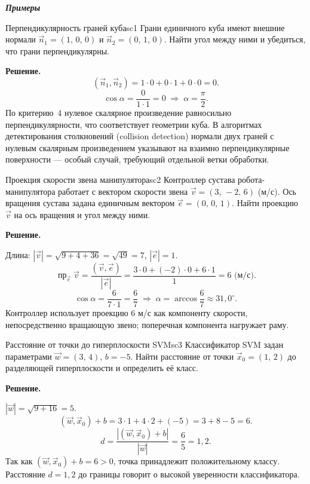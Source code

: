 \documentclass[12pt,a4paper]{article}
\begin{document}
\medskip

\textbf{\textit{Примеры}}

\begin{exampleBox}{Перпендикулярность граней куба}{sc1}
  Грани единичного куба имеют внешние нормали
  $\vec{n}_1 = (1,\,0,\,0)$ и $\vec{n}_2 = (0,\,1,\,0)$.
  Найти угол между ними и убедиться, что грани перпендикулярны.

  \textbf{Решение.}
  \[
    (\vec{n}_1,\vec{n}_2) = 1{\cdot}0 + 0{\cdot}1 + 0{\cdot}0 = 0.
  \]
  \[
    \cos\alpha = \frac{0}{1\cdot 1} = 0
    \;\Rightarrow\; \alpha = \frac{\pi}{2}.
  \]
  По критерию~4 нулевое скалярное произведение равносильно
  перпендикулярности, что соответствует геометрии куба.
  В алгоритмах детектирования столкновений (collision detection)
  нормали двух граней с нулевым скалярным произведением указывают на
  взаимно перпендикулярные поверхности --- особый случай, требующий
  отдельной ветки обработки.
\end{exampleBox}

\begin{exampleBox}{Проекция скорости звена манипулятора}{sc2}
  Контроллер сустава робота-манипулятора работает с вектором скорости
  звена $\vec{v} = (3,\,-2,\,6)$ (м/с). Ось вращения сустава задана
  единичным вектором $\vec{e} = (0,\,0,\,1)$.
  Найти проекцию $\vec{v}$ на ось вращения и угол между ними.

  \textbf{Решение.}

  Длина: $|\vec{v}|=\sqrt{9+4+36}=\sqrt{49}=7$, $|\vec{e}|=1$.
  \[
    \operatorname{пр}_{\vec{e}}\vec{v}
    = \frac{(\vec{v},\vec{e})}{|\vec{e}|}
    = \frac{3{\cdot}0+(-2){\cdot}0+6{\cdot}1}{1}
    = 6 \text{ (м/с).}
  \]
  \[
    \cos\alpha = \frac{6}{7\cdot 1} = \frac{6}{7}
    \;\Rightarrow\;
    \alpha = \arccos\frac{6}{7} \approx 31{,}0^\circ.
  \]
  Контроллер использует проекцию $6$ м/с как компоненту скорости,
  непосредственно вращающую звено; поперечная компонента нагружает раму.
\end{exampleBox}

\begin{exampleBox}{Расстояние от точки до гиперплоскости SVM}{sc3}
  Классификатор SVM задан параметрами $\vec{w}=(3,\,4)$, $b=-5$.
  Найти расстояние от точки $\vec{x}_0=(1,\,2)$ до разделяющей
  гиперплоскости и определить её класс.

  \textbf{Решение.}

  $|\vec{w}|=\sqrt{9+16}=5$.
  \[
    (\vec{w},\vec{x}_0)+b = 3{\cdot}1+4{\cdot}2+(-5) = 3+8-5 = 6.
  \]
  \[
    d = \frac{|(\vec{w},\vec{x}_0)+b|}{|\vec{w}|}
    = \frac{6}{5} = 1{,}2.
  \]
  Так как $(\vec{w},\vec{x}_0)+b=6>0$, точка принадлежит
  положительному классу. Расстояние $d=1{,}2$ до границы говорит
  о высокой уверенности классификатора.
\end{exampleBox}
\end{document}
